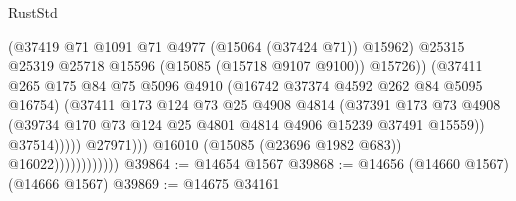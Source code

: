 \begin{lexlean}{RustStd}
\begin{coremodule}
                                            (@37419
                                              @71
                                              @1091
                                              @71
                                              @4977
                                              (@15064 (@37424 @71))
                                              @15962)
                                            @25315
                                            @25319
                                            @25718
                                            @15596
                                            (@15085 (@15718 @9107 @9100))
                                            @15726))
                                        (@37411
                                          @265
                                          @175
                                          @84
                                          @75
                                          @5096
                                          @4910
                                          (@16742 @37374 @4592 @262 @84 @5095 @16754)
                                          (@37411
                                            @173
                                            @124
                                            @73
                                            @25
                                            @4908
                                            @4814
                                            (@37391
                                              @173
                                              @73
                                              @4908
                                              (@39734
                                                @170
                                                @73
                                                @124
                                                @25
                                                @4801
                                                @4814
                                                @4906
                                                @15239
                                                @37491
                                                @15559))
                                            @37514)))))
                                  @27971)))
                            @16010
                            (@15085 (@23696 @1982 @683))
                            @16022))))))))))))
@39864 := @14654 @1567
@39868 := @14656 (@14660 @1567) (@14666 @1567)
@39869 := @14675 @34161

\end{coremodule}
\end{lexlean}

